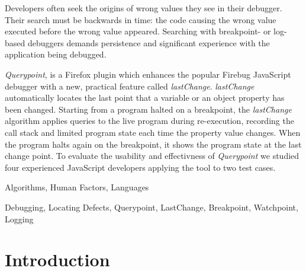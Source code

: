 \documentclass{sig-alternate}
\begin{document}

\maketitle

\begin{abstract}

\end{abstract}
Developers often seek the origins of wrong values they see in their
debugger. Their search must be backwards in time: the code causing the
wrong value executed before the wrong value appeared. Searching with
breakpoint- or log- based debuggers demands persistence and significant 
experience with the application being debugged.  

\textit{Querypoint}, is a Firefox plugin which enhances the popular 
Firebug JavaScript debugger with a new, practical feature called 
\textit{lastChange}. \textit{lastChange} automatically locates the last point that 
a variable or an object property has been changed. Starting from a 
program halted on a breakpoint, the \textit{lastChange} algorithm 
applies queries to the live program during re-execution, recording 
the call stack and limited program state each time 
the property value changes. When the program halts again on the breakpoint, 
it shows the program state at the last change point. To evaluate the usability and effectivness 
of \textit{Querypoint} we studied four experienced JavaScript developers applying the tool to two test cases.



\terms
{Algorithms, Human Factors, Languages}

\keywords
{Debugging, Locating Defects, Querypoint, LastChange, Breakpoint,
 Watchpoint, Logging}

\section{Introduction}
\end{document}
